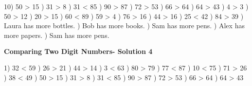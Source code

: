 \documentclass{article}%
\begin{document}
10) 50 > 15%
) 31 > 8%
) 31 < 85%
) 90 > 87%
) 72 > 53%
) 66 > 64%
) 64 > 43%
) 4 > 3%
) 50 > 12%
) 20 > 15%
) 60 < 89%
) 59 > 4%
) 76 > 16%
) 44 > 16%
) 25 < 42%
) 84 > 39%
) Laura has more bottles.%
) Bob has more books.%
) Sam has more pens.%
) Alex has more papers.%
) Sam has more pens.%
\newline%
\newpage%
\large%
\begin{center}%
\textbf{Comparing Two Digit Numbers- Solution 4}%
\newline%
\end{center} \normalsize%
1) 32 < 59%
) 26 > 21%
) 44 > 14%
) 3 < 63%
) 80 > 79%
) 77 < 87%
) 10 < 75%
) 71 > 26%
) 38 < 49%
) 50 > 15%
) 31 > 8%
) 31 < 85%
) 90 > 87%
) 72 > 53%
) 66 > 64%
) 64 > 43%
\newline%
\end{document}
